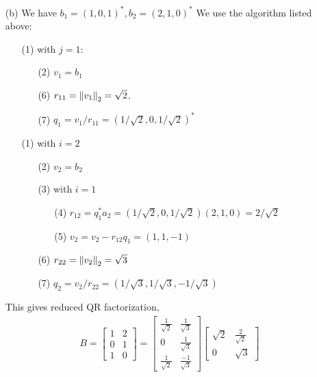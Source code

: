 \documentclass[10pt]{article}
\begin{document}
\begin{solution}[Solution]
\begin{enumerate}
    \item[(b)] We have \( b_1=(1,0,1)^*, b_2=(2,1,0)^* \)
    We use the algorithm listed above:    
        \begin{enumerate}  
        \item[(1)] with \( j=1 \):
            \begin{enumerate}
                \item[(2)]  \( v_1=b_1 \)
                \item[(6)]  \( r_{11} = \left\lVert v_1\right\rVert_2 = \sqrt{2} \).
                \item[(7)]  \( q_1 = v_1/r_{11} = (1/\sqrt{2},0,1/\sqrt{2})^* \)
            \end{enumerate}
        \item[(1)] with \( i=2 \)
            \begin{enumerate}
                \item[(2)] \( v_2=b_2 \)
                \item[(3)] with \( i=1 \)
                    \begin{enumerate}
                        \item[(4)] \( r_{12}=q_1^*a_2 = (1/\sqrt{2},0,1/\sqrt{2})(2,1,0) = 2/\sqrt{2}  \)
                        \item[(5)] \( v_2=v_2-r_{12}q_1 = (1,1,-1) \)
                    \end{enumerate}
                \item[(6)] \( r_{22}=\left\lVert v_2\right\rVert_2 = \sqrt{3} \)
                \item[(7)] \( q_2 = v_2/r_{22} = (1/\sqrt{3},1/\sqrt{3},-1/\sqrt{3}) \)
            \end{enumerate}
        \end{enumerate}

        This gives reduced QR factorization,
        \begin{align*}
            B = \left[\begin{array}{cc}1 & 2\\0 & 1\\1 & 0\end{array}\right] = \left[\begin{array}{cc}\frac{1}{\sqrt{2}} & \frac{1}{\sqrt{3}}\\ 0 & \frac{1}{\sqrt{3}} \\ \frac{1}{\sqrt{2}} & \frac{-1}{\sqrt{3}}\end{array}\right]\left[\begin{array}{cc}\sqrt{2} & \frac{2}{\sqrt{2}} \\ 0 & \sqrt{3}\end{array}\right]
        \end{align*}
  

\end{enumerate}
\end{solution}
\end{document}
